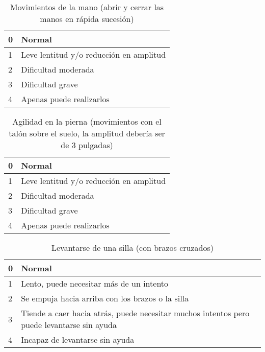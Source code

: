 \begin{table}[H]
\begin{center}
\begin{tabular}{|p{1cm}|p{11cm}|}
\hline
0 & Normal \\\hline
1 & Leve lentitud y/o reducción en amplitud \\\hline
2 & Dificultad moderada\\\hline
3 & Dificultad grave \\\hline
4 & Apenas puede realizarlos\\\hline
\end{tabular}
\caption{Movimientos de la mano (abrir y cerrar las manos en rápida sucesión)}
\end{center}
\end{table}

\begin{table}[H]
\begin{center}
\begin{tabular}{|p{1cm}|p{11cm}|}
\hline
0 & Normal \\\hline
1 & Leve lentitud y/o reducción en amplitud \\\hline
2 & Dificultad moderada\\\hline
3 & Dificultad grave \\\hline
4 & Apenas puede realizarlos\\\hline
\end{tabular}
\caption{Agilidad en la pierna (movimientos con el talón sobre el suelo, la amplitud debería ser de 3 pulgadas)}
\end{center}
\end{table}

\begin{table}[H]
\begin{center}
\begin{tabular}{|p{1cm}|p{11cm}|}
\hline
0 & Normal \\\hline
1 & Lento, puede necesitar más de un intento \\\hline
2 & Se empuja hacia arriba con los brazos o la silla\\\hline
3 & Tiende a caer hacia atrás, puede necesitar muchos intentos pero puede levantarse sin ayuda \\\hline
4 & Incapaz de levantarse sin ayuda\\\hline
\end{tabular}
\caption{Levantarse de una silla (con brazos cruzados)}
\end{center}
\end{table}



